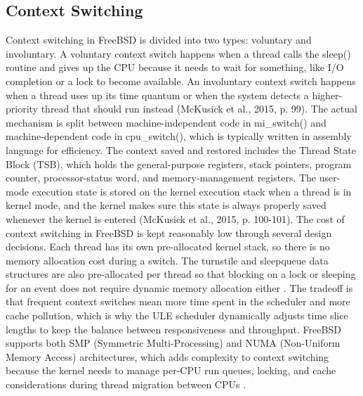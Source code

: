 \subsection{Context Switching}
Context switching in FreeBSD is divided into two types: voluntary and involuntary. A voluntary context switch happens when a thread calls the sleep() routine and gives up the CPU because it needs to wait for something, like I/O completion or a lock to become available. An involuntary context switch happens when a thread uses up its time quantum or when the system detects a higher-priority thread that should run instead (McKusick et al., 2015, p. 99).
The actual mechanism is split between machine-independent code in mi\_switch() and machine-dependent code in cpu\_switch(), which is typically written in assembly language for efficiency. The context saved and restored includes the Thread State Block (TSB), which holds the general-purpose registers, stack pointers, program counter, processor-status word, and memory-management registers. The user-mode execution state is stored on the kernel execution stack when a thread is in kernel mode, and the kernel makes sure this state is always properly saved whenever the kernel is entered (McKusick et al., 2015, p. 100-101).
The cost of context switching in FreeBSD is kept reasonably low through several design decisions. Each thread has its own pre-allocated kernel stack, so there is no memory allocation cost during a switch. The turnstile and sleepqueue data structures are also pre-allocated per thread so that blocking on a lock or sleeping for an event does not require dynamic memory allocation either \parencite{watson2015}. The tradeoff is that frequent context switches mean more time spent in the scheduler and more cache pollution, which is why the ULE scheduler dynamically adjusts time slice lengths to keep the balance between responsiveness and throughput.
FreeBSD supports both SMP (Symmetric Multi-Processing) and NUMA (Non-Uniform Memory Access) architectures, which adds complexity to context switching because the kernel needs to manage per-CPU run queues, locking, and cache considerations during thread migration between CPUs \parencite{watson2015}.

